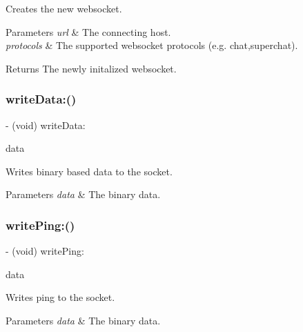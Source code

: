 Creates the new websocket. 
\begin{DoxyParams}{Parameters}
{\em url} & The connecting host. \\
\hline
{\em protocols} & The supported websocket protocols (e.\+g. chat,superchat). \\
\hline
\end{DoxyParams}
\begin{DoxyReturn}{Returns}
The newly initalized websocket. 
\end{DoxyReturn}
\hypertarget{interface_s_t_c_web_socket_aa01158bb007d83492e3b6854d873a79a}{}\label{interface_s_t_c_web_socket_aa01158bb007d83492e3b6854d873a79a} 
\subsubsection{\texorpdfstring{write\+Data\+:()}{writeData:()}}
{\footnotesize\ttfamily -\/ (void) write\+Data\+: \begin{DoxyParamCaption}\item[{(nonnull N\+S\+Data $\ast$)}]{data }\end{DoxyParamCaption}}

Writes binary based data to the socket. 
\begin{DoxyParams}{Parameters}
{\em data} & The binary data. \\
\hline
\end{DoxyParams}
\hypertarget{interface_s_t_c_web_socket_aa9649b3dcf83928d0cd204e11d798fd9}{}\label{interface_s_t_c_web_socket_aa9649b3dcf83928d0cd204e11d798fd9} 
\subsubsection{\texorpdfstring{write\+Ping\+:()}{writePing:()}}
{\footnotesize\ttfamily -\/ (void) write\+Ping\+: \begin{DoxyParamCaption}\item[{(nonnull N\+S\+Data $\ast$)}]{data }\end{DoxyParamCaption}}

Writes ping to the socket. 
\begin{DoxyParams}{Parameters}
{\em data} & The binary data. \\
\hline
\end{DoxyParams}
\hypertarget{interface_s_t_c_web_socket_ade901b3fd9c09fddfb92dcb0cd8803fb}{}\label{interface_s_t_c_web_socket_ade901b3fd9c09fddfb92dcb0cd8803fb} 
